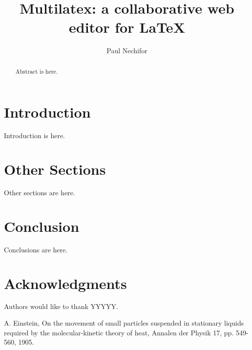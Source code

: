 \documentclass{llncs}
\begin{document}
\title{Multilatex: a collaborative web editor for \LaTeX}

\author{Paul Nechifor}


\maketitle

\begin{abstract}

Abstract is here.

\end{abstract}

\section{Introduction}\label{sec:Introduction}

Introduction is here.

\section{Other Sections}\label{sec:Others}

Other sections are here. 


\section{Conclusion}\label{sec:Conclusion}

Conclusions are here.

\section*{Acknowledgments}\label{sec:Acknowledgments}

Authors would like to thank YYYYY.

\begin{thebibliography}{1}

A. Einstein, On the movement of small particles suspended in stationary liquids required by the molecular-kinetic theory of heat, Annalen der Physik 17, pp. 549-560, 1905.

\end{thebibliography}
\end{document}
